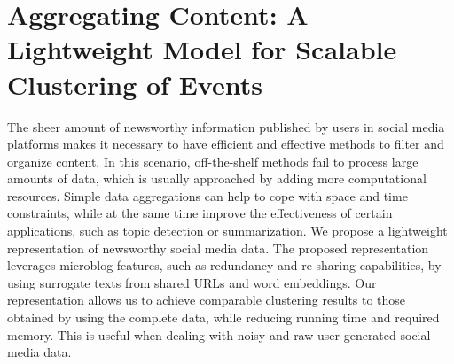 \chapter{Aggregating Content: A Lightweight Model for Scalable Clustering of Events}

The sheer amount of newsworthy information published by users in social media
platforms makes it necessary to have efficient and effective methods to filter
and organize content. 
%
In this scenario, off-the-shelf methods fail to process large amounts of data,
which is usually approached by adding more computational resources. 
%
Simple data aggregations can help to cope with space and time constraints,
while at the same time improve the effectiveness of certain applications, such
as topic detection or summarization. 
%
We propose a lightweight representation of newsworthy social media data. 
%
The proposed representation leverages microblog features, such as redundancy
and re-sharing capabilities, by using surrogate texts from shared URLs and
word embeddings.
%
Our representation allows us to achieve comparable clustering results to those obtained by using the complete data, while reducing running time and required memory.
%
This is useful when dealing with noisy and raw user-generated social media data.












